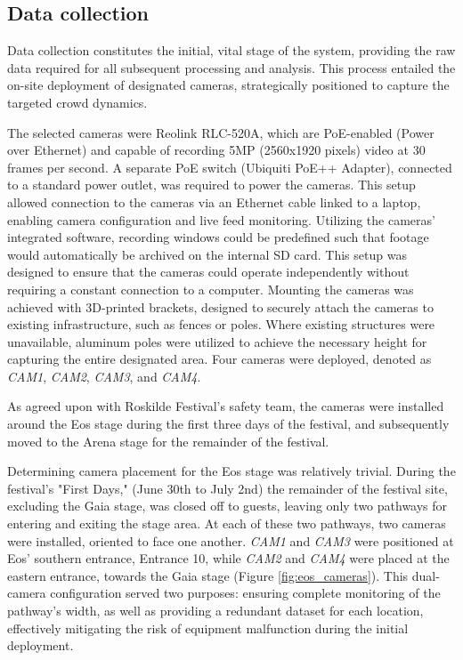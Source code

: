 \subsection{Data collection}
\label{sec:data_collection}

Data collection constitutes the initial, vital stage of the system, providing the raw data required for all subsequent processing and analysis. This process entailed the on-site deployment of designated cameras, strategically positioned to capture the targeted crowd dynamics.

The selected cameras were Reolink RLC-520A, which are PoE-enabled (Power over Ethernet) and capable of recording 5MP (2560x1920 pixels) video at 30 frames per second. A separate PoE switch (Ubiquiti PoE++ Adapter), connected to a standard power outlet, was required to power the cameras. This setup allowed connection to the cameras via an Ethernet cable linked to a laptop, enabling camera configuration and live feed monitoring. Utilizing the cameras' integrated software, recording windows could be predefined such that footage would automatically be archived on the internal SD card. This setup was designed to ensure that the cameras could operate independently without requiring a constant connection to a computer. Mounting the cameras was achieved with 3D-printed brackets, designed to securely attach the cameras to existing infrastructure, such as fences or poles. Where existing structures were unavailable, aluminum poles were utilized to achieve the necessary height for capturing the entire designated area. Four cameras were deployed, denoted as \textit{CAM1}, \textit{CAM2}, \textit{CAM3}, and \textit{CAM4}.

As agreed upon with Roskilde Festival's safety team, the cameras were installed around the Eos stage during the first three days of the festival, and subsequently moved to the Arena stage for the remainder of the festival.

Determining camera placement for the Eos stage was relatively trivial. During the festival's "First Days," (June 30th to July 2nd) the remainder of the festival site, excluding the Gaia stage, was closed off to guests, leaving only two pathways for entering and exiting the stage area. At each of these two pathways, two cameras were installed, oriented to face one another. \textit{CAM1} and \textit{CAM3} were positioned at Eos' southern entrance, Entrance 10, while \textit{CAM2} and \textit{CAM4} were placed at the eastern entrance, towards the Gaia stage (Figure \ref{fig:eos_cameras}). This dual-camera configuration served two purposes: ensuring complete monitoring of the pathway's width, as well as providing a redundant dataset for each location, effectively mitigating the risk of equipment malfunction during the initial deployment.

